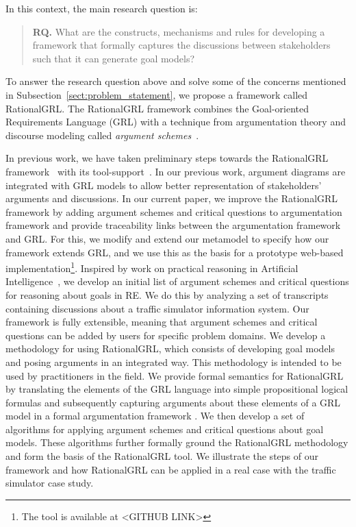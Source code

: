 In this context, the main research question is: 

\begin{quote}
\textbf{RQ.} What are the constructs, mechanisms and rules for developing a framework that formally captures the discussions between stakeholders such that it can generate goal models?
\end{quote}
To answer the research question above and solve some of the concerns mentioned in Subsection~\ref{sect:problem_statement}, we propose a framework called RationalGRL. The RationalGRL framework combines the Goal-oriented Requirements Language (GRL) with a technique from argumentation theory and discourse modeling called \emph{argument schemes}~\cite{walton-etal2004}. 

In previous work, we have taken preliminary steps towards the RationalGRL framework~\cite{bnaic2014,vanzee-etal:renext2015,vanZee-etal:er2016} with its tool-support~\cite{vanZee-etal:comma2016}.  In our previous work, argument diagrams are integrated with GRL models to allow better representation of stakeholders' arguments and discussions. In our current paper, we improve the RationalGRL framework by adding argument schemes and critical questions to argumentation framework and provide traceability links between the argumentation framework and GRL.  For this, we modify and extend our metamodel to specify how our framework extends GRL, and we use this as the basis for a prototype web-based implementation\footnote{The tool is available at <GITHUB LINK>}. %
Inspired by work on practical reasoning in Artificial Intelligence~\cite{atkinson2007}, we develop an initial list of argument schemes and critical questions for reasoning about goals in RE. We do this by analyzing a set of transcripts containing discussions about a traffic simulator information system. Our framework is fully extensible, meaning that argument schemes and critical questions can be added by users for specific problem domains. We develop a methodology for using RationalGRL, which consists of developing goal models and posing arguments in an integrated way. This methodology is intended to be used by practitioners in the field. We provide formal semantics for RationalGRL by translating the elements of the GRL language into simple propositional logical formulas and subsequently capturing arguments about these elements of a GRL model in a formal argumentation framework \cite{dung1995}. We then develop a set of algorithms for applying argument schemes and critical questions about goal models. These algorithms further formally ground the RationalGRL methodology and form the basis of the RationalGRL tool. We illustrate the steps of our framework and how RationalGRL can be applied in a real case with the traffic simulator case study.

